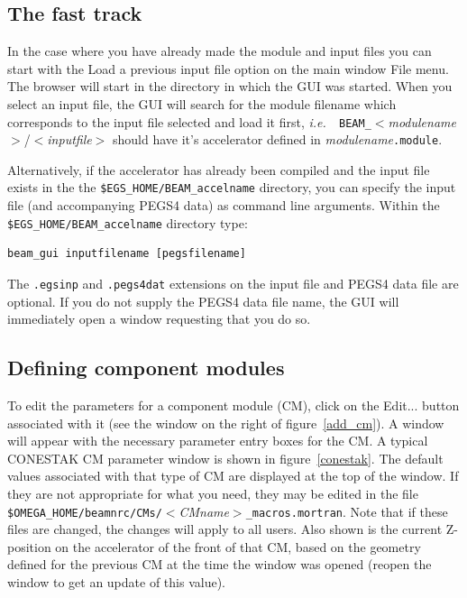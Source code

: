 \documentclass[12pt,twoside]{article}
\newcommand{\ie}{{\em i.e.}}
\begin{document}
\subsection{The fast track}

In the case where you have already made the module and input files you can start with the {\sf Load a
previous input file} option on the main window {\sf File} menu.  The browser
will start in the directory in which the GUI was started.  When you
select an input file, the GUI will search for the module filename which
corresponds to the input file selected and load it first, \ie~{\tt
BEAM\_}$<${\em modulename}$>$/$<${\em inputfile}$>$ should have it's
accelerator defined in {\em modulename}{\tt .module}.

Alternatively, if the accelerator has already been compiled and the input file exists
in the the {\tt \$EGS\_HOME/BEAM\_accelname} directory, you can specify the input file
(and accompanying PEGS4 data) as command line arguments.  Within the
{\tt \$EGS\_HOME/BEAM\_accelname} directory type:
\begin{verbatim}
beam_gui inputfilename [pegsfilename]
\end{verbatim}
The {\tt .egsinp} and {\tt .pegs4dat} extensions on the input file and PEGS4 data file are
optional.  If you do not supply the PEGS4 data file name, the GUI will immediately
open a window requesting that you do so.

\subsection{Defining component modules}

To edit the parameters for a component module (CM), click on the {\sf
Edit...} button associated with it (see the window on the right of
figure~\ref{add_cm}). A window will appear
with the necessary parameter entry boxes for the CM.  A typical CONESTAK
CM parameter window is shown in figure~\ref{conestak}.  The default
values associated with that type of CM are displayed at the top of the
window.  If they are not appropriate for what you need, they may be
edited in the file
{\tt \$OMEGA\_HOME/beamnrc/CMs/}$<${\em CMname}$>${\tt \_macros.mortran}.
Note that if these files are changed, the changes will apply to all
users.  Also
shown is the current Z-position on the accelerator of the front of that
CM, based on the geometry defined for the previous CM at the time the
window was opened (reopen the window to get an update of this value).
\end{document}
